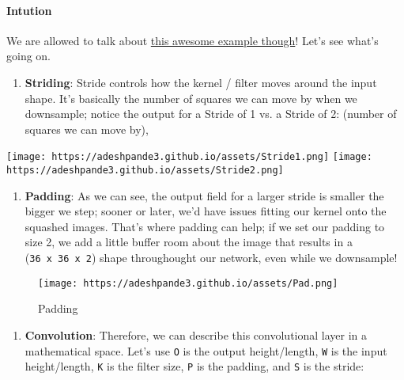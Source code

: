 \documentclass[11pt]{article}
\makeatletter
\def\maxwidth{\ifdim\Gin@nat@width>\linewidth\linewidth
    \else\Gin@nat@width\fi}
\let\Oldincludegraphics\includegraphics
\renewcommand{\includegraphics}[1]{\Oldincludegraphics[width=.8\maxwidth]{#1}}
\providecommand{\tightlist}{%
      \setlength{\itemsep}{0pt}\setlength{\parskip}{0pt}}
\makeatother
\begin{document}
\paragraph{Intution}\label{intution}

We are allowed to talk about
\href{https://adeshpande3.github.io/adeshpande3.github.io/A-Beginner's-Guide-To-Understanding-Convolutional-Neural-Networks-Part-2/}{this
awesome example though}! Let's see what's going on.

\begin{enumerate}
\def\labelenumi{\arabic{enumi})}
\tightlist
\item
  \textbf{Striding}: Stride controls how the kernel / filter moves
  around the input shape. It's basically the number of squares we can
  move by when we downsample; notice the output for a Stride of 1 vs. a
  Stride of 2: (number of squares we can move by),
\end{enumerate}

\texttt{[image: https://adeshpande3.github.io/assets/Stride1.png]}
\texttt{[image: https://adeshpande3.github.io/assets/Stride2.png]}

\begin{enumerate}
\def\labelenumi{\arabic{enumi})}
\setcounter{enumi}{1}
\tightlist
\item
  \textbf{Padding}: As we can see, the output field for a larger stride
  is smaller the bigger we step; sooner or later, we'd have issues
  fitting our kernel onto the squashed images. That's where padding can
  help; if we set our padding to size 2, we add a little buffer room
  about the image that results in a (\texttt{36\ x\ 36\ x\ 2}) shape
  throughought our network, even while we downsample!
\end{enumerate}

\begin{figure}
\centering
\texttt{[image: https://adeshpande3.github.io/assets/Pad.png]}
\caption{Padding}
\end{figure}

\begin{enumerate}
\def\labelenumi{\arabic{enumi})}
\setcounter{enumi}{2}
\tightlist
\item
  \textbf{Convolution}: Therefore, we can describe this convolutional
  layer in a mathematical space. Let's use \texttt{O} is the output
  height/length, \texttt{W} is the input height/length, \texttt{K} is
  the filter size, \texttt{P} is the padding, and \texttt{S} is the
  stride:
\end{enumerate}
\end{document}
